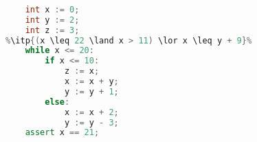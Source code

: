 \begin{lstlisting}[language=C++,basicstyle=\ttfamily,keywordstyle=\color{blue}, escapechar=\%]  % Start your code-block
	
	int x := 0;
	int y := 2;
	int z := 3;
%\itp{(x \leq 22 \land x > 11) \lor x \leq y + 9}%
	while x <= 20:
		if x <= 10:
			z := x;
			x := x + y;
			y := y + 1;
		else:
			x := x + 2;
			y := y - 3;
	assert x == 21;
	\end{lstlisting}